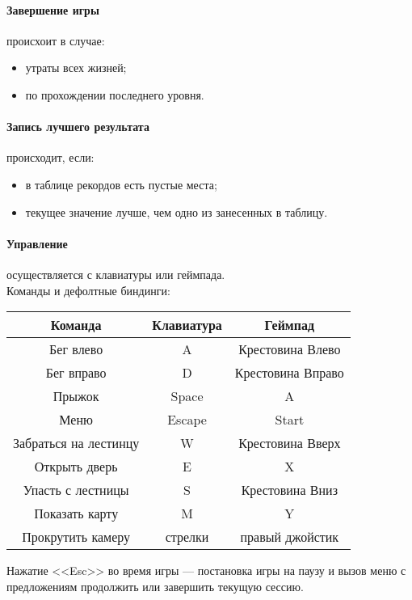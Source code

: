 \documentclass[12pt,a4paper,fullpage]{article}
\begin{document}
\paragraph{Завершение игры} происхоит в случае:
\begin{itemize}
	\item утраты всех жизней;
	\item по прохождении последнего уровня.
\end{itemize}

\paragraph{Запись лучшего результата} происходит, если:
\begin{itemize}
	\item в таблице рекордов есть пустые места;
	\item текущее значение лучше, чем одно из занесенных в таблицу.
\end{itemize}

\paragraph{Управление} осуществляется с клавиатуры или геймпада.\\
Команды и дефолтные биндинги:\\

\begin{tabulary}{\linewidth}{|C|C|C|}
	\hline
	Команда & Клавиатура & Геймпад\\
	\hline
	Бег влево & A & Крестовина Влево \\
	\hline
	Бег вправо & D & Крестовина Вправо \\
	\hline
	Прыжок & Space & A \\
	\hline
	Меню & Escape & Start \\
	\hline
	Забраться на лестинцу & W & Крестовина Вверх \\
	\hline
	Открыть дверь & E & X \\
	\hline
	Упасть с лестницы & S & Крестовина Вниз \\
	\hline
	Показать карту & M & Y \\
	\hline
	Прокрутить камеру & стрелки & правый джойстик \\
	\hline
\end{tabulary}
\vspace{10pt}

Нажатие <<Esc>> во время игры --- постановка игры на паузу и вызов меню с предложениям продолжить или завершить текущую сессию.\\
\end{document}
